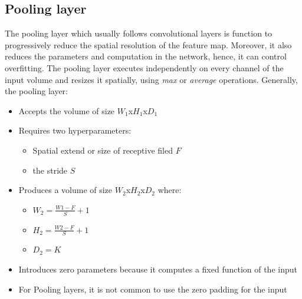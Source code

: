 \subsection{Pooling layer}
The pooling layer which usually follows convolutional layers is function to progressively reduce the spatial resolution of the feature map. Moreover, it also reduces the parameters and computation in the network, hence, it can control overfitting. The pooling layer executes independently on every channel of the input volume and resizes it spatially, using \textit{max} or \textit{average} operations. Generally, the pooling layer:
\begin{itemize}
    \item Accepts the volume of size $W_1$x$H_1$x$D_1$
    \item Requires two hyperparameters:
    \begin{itemize}
        \item Spatial extend or size of receptive filed $F$
        \item the stride $S$
    \end{itemize}
    \item Produces a volume of size $W_2$x$H_2$x$D_2$ where:
    \begin{itemize}
        \item $W_2 = \frac{W1-F}{S} + 1$
        \item $H_2 = \frac{W2-F}{S} + 1$
        \item $D_2=K$
    \end{itemize}
    \item Introduces zero parameters because it computes a fixed function of the input
    \item For Pooling layers, it is not common to use the zero padding for the input
\end{itemize}
